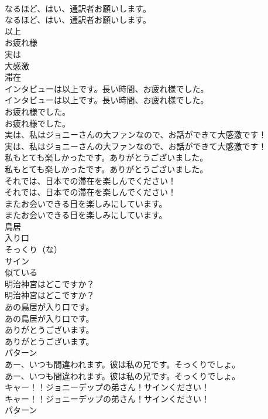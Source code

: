 \documentclass[8pt]{extreport}
\begin{document}
\begin{CJK}{UTF8}{min}
\\	なるほど、はい、通訳者お願いします。	
\\	なるほど、はい、通訳者お願いします。 
\\	以上
\\	お疲れ様
\\	実は
\\	大感激
\\	滞在
\\	インタビューは以上です。長い時間、お疲れ様でした。	
\\	インタビューは以上です。長い時間、お疲れ様でした。 
\\	お疲れ様でした。	
\\	お疲れ様でした。 
\\	実は、私はジョニーさんの大ファンなので、お話ができて大感激です！	
\\	実は、私はジョニーさんの大ファンなので、お話ができて大感激です！ 
\\	私もとても楽しかったです。ありがとうございました。	
\\	私もとても楽しかったです。ありがとうございました。 
\\	それでは、日本での滞在を楽しんでください！	
\\	それでは、日本での滞在を楽しんでください！ 
\\	またお会いできる日を楽しみにしています。	
\\	またお会いできる日を楽しみにしています。 
\\	鳥居
\\	入り口
\\	そっくり（な）
\\	サイン
\\	似ている
\\	明治神宮はどこですか？	
\\	明治神宮はどこですか？ 
\\	あの鳥居が入り口です。	
\\	あの鳥居が入り口です。 
\\	ありがとうございます。	
\\	ありがとうございます。 
\\	パターン
\\	あー、いつも間違われます。彼は私の兄です。そっくりでしょ。	
\\	あー、いつも間違われます。彼は私の兄です。そっくりでしょ。 
\\	キャー！！ジョニーデップの弟さん！サインください！	
\\	キャー！！ジョニーデップの弟さん！サインください！ 
\\	パターン

\end{CJK}
\end{document}
